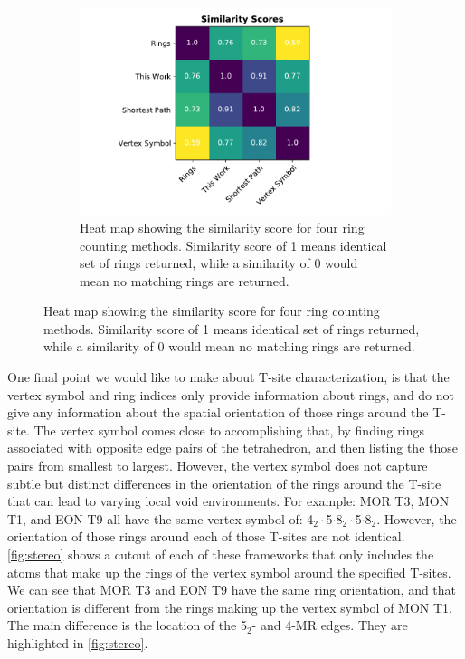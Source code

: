 \documentclass[11pt]{article}
\begin{document}
\begin{figure}
\begin{figure}[H]
\centering
\includegraphics[width=\textwidth]{figures/chapter-3/similarity-heat-map.pdf}
\caption{Heat map showing the similarity score for four ring counting methods. Similarity score of 1 means identical set of rings returned, while a similarity of 0 would mean no matching rings are returned. \label{fig:similarity}}
\end{figure}
\end{figure}

One final point we would like to make about T-site characterization, is that the vertex symbol and ring indices only provide information about rings, and do not give any information about the spatial orientation of those rings around the T-site. The vertex symbol comes close to accomplishing that, by finding rings associated with opposite edge pairs of the tetrahedron, and then listing the those pairs from smallest to largest. However, the vertex symbol does not capture subtle but distinct differences in the orientation of the rings around the T-site that can lead to varying local void environments. For example: MOR T3, MON T1, and EON T9 all have the same vertex symbol of: 4\(_{\text{2}} \cdot\)5\(\cdot\)8\(_{\text{2}} \cdot\)5\(\cdot\)8\(_{\text{2}}\). However, the orientation of those rings around each of those T-sites are not identical. \cref{fig:stereo} shows a cutout of each of these frameworks that only includes the atoms that make up the rings of the vertex symbol around the specified T-sites. We can see that MOR T3 and EON T9 have the same ring orientation, and that orientation is different from the rings making up the vertex symbol of MON T1. The main difference is the location of the 5\(_{\text{2}}\)- and 4-MR edges. They are highlighted in \cref{fig:stereo}.
\end{document}
